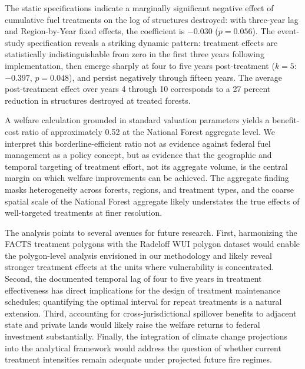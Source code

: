 \documentclass[12pt, letterpaper]{article}
\begin{document}
The static specifications indicate a marginally significant negative effect of cumulative fuel treatments on the log of structures destroyed: with three-year lag and Region-by-Year fixed effects, the coefficient is $-0.030$ ($p = 0.056$). The event-study specification reveals a striking dynamic pattern: treatment effects are statistically indistinguishable from zero in the first three years following implementation, then emerge sharply at four to five years post-treatment ($k = 5$: $-0.397$, $p = 0.048$), and persist negatively through fifteen years. The average post-treatment effect over years 4 through 10 corresponds to a 27 percent reduction in structures destroyed at treated forests.

A welfare calculation grounded in standard valuation parameters yields a benefit-cost ratio of approximately 0.52 at the National Forest aggregate level. We interpret this borderline-efficient ratio not as evidence against federal fuel management as a policy concept, but as evidence that the geographic and temporal targeting of treatment effort, not its aggregate volume, is the central margin on which welfare improvements can be achieved. The aggregate finding masks heterogeneity across forests, regions, and treatment types, and the coarse spatial scale of the National Forest aggregate likely understates the true effects of well-targeted treatments at finer resolution.

The analysis points to several avenues for future research. First, harmonizing the FACTS treatment polygons with the Radeloff WUI polygon dataset would enable the polygon-level analysis envisioned in our methodology and likely reveal stronger treatment effects at the units where vulnerability is concentrated. Second, the documented temporal lag of four to five years in treatment effectiveness has direct implications for the design of treatment maintenance schedules; quantifying the optimal interval for repeat treatments is a natural extension. Third, accounting for cross-jurisdictional spillover benefits to adjacent state and private lands would likely raise the welfare returns to federal investment substantially. Finally, the integration of climate change projections into the analytical framework would address the question of whether current treatment intensities remain adequate under projected future fire regimes.
\end{document}
